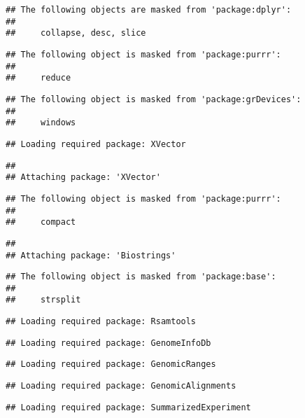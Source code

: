 \documentclass[]{article}
\begin{document}
\begin{verbatim}
## The following objects are masked from 'package:dplyr':
## 
##     collapse, desc, slice
\end{verbatim}

\begin{verbatim}
## The following object is masked from 'package:purrr':
## 
##     reduce
\end{verbatim}

\begin{verbatim}
## The following object is masked from 'package:grDevices':
## 
##     windows
\end{verbatim}

\begin{verbatim}
## Loading required package: XVector
\end{verbatim}

\begin{verbatim}
## 
## Attaching package: 'XVector'
\end{verbatim}

\begin{verbatim}
## The following object is masked from 'package:purrr':
## 
##     compact
\end{verbatim}

\begin{verbatim}
## 
## Attaching package: 'Biostrings'
\end{verbatim}

\begin{verbatim}
## The following object is masked from 'package:base':
## 
##     strsplit
\end{verbatim}

\begin{verbatim}
## Loading required package: Rsamtools
\end{verbatim}

\begin{verbatim}
## Loading required package: GenomeInfoDb
\end{verbatim}

\begin{verbatim}
## Loading required package: GenomicRanges
\end{verbatim}

\begin{verbatim}
## Loading required package: GenomicAlignments
\end{verbatim}

\begin{verbatim}
## Loading required package: SummarizedExperiment
\end{verbatim}
\end{document}
